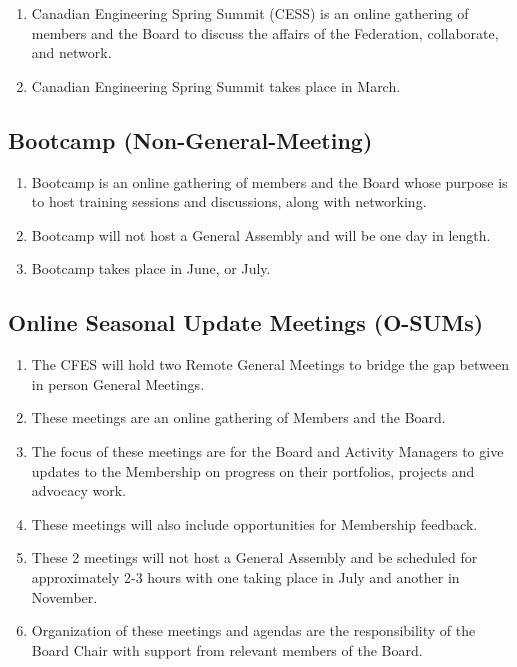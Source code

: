 \begin{enumerate}
 \item
  Canadian Engineering Spring Summit (CESS) is an online gathering of members and the Board to discuss the affairs of the Federation, collaborate, and network.
 \item
  Canadian Engineering Spring Summit takes place in March.
\end{enumerate}

\subsection{Bootcamp (Non-General-Meeting)}
\label{bootcamp-non-general-meeting}

\begin{enumerate}
 \item
  Bootcamp is an online gathering of members and the Board whose purpose is to host training sessions and discussions, along with networking.
 \item
  Bootcamp will not host a General Assembly and will be one day in length.
 \item
  Bootcamp takes place in June, or July.
\end{enumerate}

\subsection{Online Seasonal Update Meetings (O-SUMs)}
\label{online-seasonal-update-meetings-o-sums}

\begin{enumerate}
 \item
  The CFES will hold two Remote General Meetings to bridge the gap between in person General Meetings.
 \item
  These meetings are an online gathering of Members and the Board.
 \item
  The focus of these meetings are for the Board and Activity Managers to give updates to the Membership on progress on their portfolios, projects and advocacy work.
 \item
  These meetings will also include opportunities for Membership feedback.
 \item
  These 2 meetings will not host a General Assembly and be scheduled for approximately 2-3 hours with one taking place in July and another in November.
 \item
  Organization of these meetings and agendas are the responsibility of the Board Chair with support from relevant members of the Board.
\end{enumerate}

